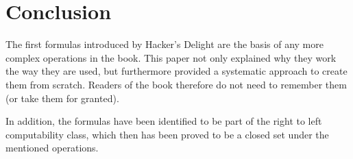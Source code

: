 \section{Conclusion}\label{sec:conclusion}
The first formulas introduced by Hacker's Delight \cite{Warren:2012:HD:2462741}
are the basis of any more complex operations in the book.
This paper not only explained why they work the way they are used,
but furthermore provided a systematic approach to create them from scratch.
Readers of the book therefore do not need to remember them
(or take them for granted).

In addition, the formulas have been identified to be part of
the right to left computability class,
which then has been proved to be a closed set
under the mentioned operations.
